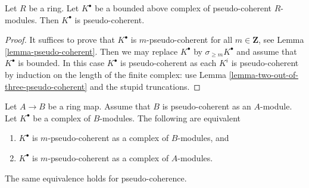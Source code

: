 \begin{lemma}
\label{lemma-complex-pseudo-coherent-modules}
Let $R$ be a ring. Let $K^\bullet$ be a bounded above complex of
pseudo-coherent $R$-modules. Then $K^\bullet$ is pseudo-coherent.
\end{lemma}

\begin{proof}
It suffices to prove that $K^\bullet$ is $m$-pseudo-coherent for
all $m \in \mathbf{Z}$, see
Lemma \ref{lemma-pseudo-coherent}.
Then we may replace $K^\bullet$ by $\sigma_{\geq m}K^\bullet$
and assume that $K^\bullet$ is bounded.
In this case $K^\bullet$ is pseudo-coherent as each $K^i$ is pseudo-coherent
by induction on the length of the finite complex: use
Lemma \ref{lemma-two-out-of-three-pseudo-coherent}
and the stupid truncations.
\end{proof}

\begin{lemma}
\label{lemma-finite-push-pseudo-coherent}
Let $A \to B$ be a ring map. Assume that $B$ is pseudo-coherent as an
$A$-module. Let $K^\bullet$ be a complex of $B$-modules.
The following are equivalent
\begin{enumerate}
\item $K^\bullet$ is $m$-pseudo-coherent
as a complex of $B$-modules, and
\item $K^\bullet$ is $m$-pseudo-coherent
as a complex of $A$-modules.
\end{enumerate}
The same equivalence holds for pseudo-coherence.
\end{lemma}

